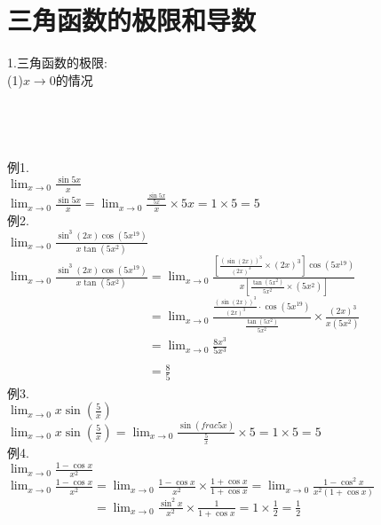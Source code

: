 \chapter{三角函数的极限和导数}
1.三角函数的极限:\\
(1)$x\to 0$的情况\\[2ex]
\\[2ex]
\\[2ex]
\\[2ex]
\\[2ex]
例1.\\
\phantom{例}$\displaystyle\lim_{x\to 0}\frac{\sin5x}{x}$\\
$\displaystyle\lim_{x\to 0}\frac{\sin5x}{x}=\lim_{x\to 0}\frac{\frac{\sin5x}{5x}}{x}\times5x=1\times5=5$\\

例2.\\
\phantom{例}$\displaystyle\lim_{x\to 0}\frac{\sin^3(2x)\cos(5x^{19})}{x\tan(5x^2)}$
$\displaystyle\lim_{x\to 0}\frac{\sin^3(2x)\cos(5x^{19})}{x\tan(5x^2)}=\lim_{x\to 0}\frac{[\frac{(\sin(2x))^3}{(2x)^3}\times (2x)^3]\cos(5x^{19})}{x[\frac{\tan(5x^2)}{5x^2}\times (5x^2)]}$\\
$\displaystyle\phantom{\lim_{x\to 0}\frac{\sin^3(2x)\cos(5x^{19})}{x\tan(5x^2)}}=\lim_{x\to 0}\frac{\frac{(\sin(2x))^3}{(2x)^3}\cdot\cos(5x^{19})}{\frac{\tan(5x^2)}{5x^2}}\times\frac{(2x)^3}{x(5x^2)}$\\
$\displaystyle\phantom{\lim_{x\to 0}\frac{\sin^3(2x)\cos(5x^{19})}{x\tan(5x^2)}}=\lim_{x\to 0}\frac{8x^3}{5x^3}$\\
$\displaystyle\phantom{\lim_{x\to 0}\frac{\sin^3(2x)\cos(5x^{19})}{x\tan(5x^2)}}=\frac{8}{5}$\\

例3.\\
\phantom{例}$\displaystyle\lim_{x\to 0}x\sin(\frac{5}{x})$\\
$\displaystyle\lim_{x\to 0}x\sin(\frac{5}{x})=\lim_{x\to 0}\frac{\sin(frac{5}{x})}{\frac{5}{x}}\times5=1\times5=5$\\

例4.\\
\phantom{例}$\displaystyle\lim_{x\to 0}\frac{1-\cos x}{x^2}$\\
$\displaystyle\lim_{x\to 0}\frac{1-\cos x}{x^2}=\lim_{x\to 0}\frac{1-\cos x}{x^2}\times\frac{1+\cos x}{1+\cos x}=\lim_{x\to 0}\frac{1-\cos^2x}{x^2(1+\cos x)}$\\
$\displaystyle\phantom{\lim_{x\to 0}\frac{1-\cos x}{x^2}}=\lim_{x\to 0}\frac{\sin^2x}{x^2}\times\frac{1}{1+\cos x}=1\times\frac{1}{2}=\frac{1}{2}$\\[2ex]

